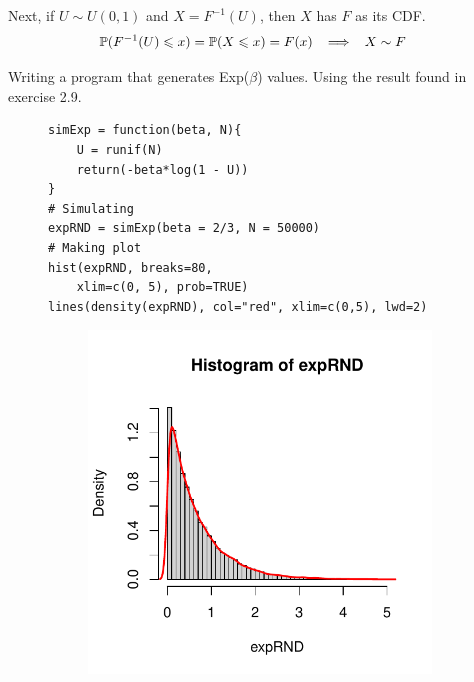 Next, if $U\sim U(0,1)$ and $X = F^{-1}(U)$, then $X$ has $F$ as its CDF. %
\begin{align*}
    \mathbb{P}(F^{-1}(U)\leqslant x) &= \mathbb{P}(X \leqslant x) = F(x) \;\;\implies\;\; X\sim F
\end{align*}

Writing a program that generates Exp($\beta$) values. Using the result found in exercise 2.9.

\begin{figure}[H]
    \begin{minipage}{0.5\textwidth}
        \begin{lstlisting}[style=RSyntax]
simExp = function(beta, N){
    U = runif(N)
    return(-beta*log(1 - U))
}
# Simulating
expRND = simExp(beta = 2/3, N = 50000)
# Making plot
hist(expRND, breaks=80,
    xlim=c(0, 5), prob=TRUE)
lines(density(expRND), col="red", xlim=c(0,5), lwd=2)
        \end{lstlisting}
        \begin{center}
            \begin{figure}[H]
            \includegraphics[scale=0.7]{ch2_2.15.pdf}
            \end{figure}
        \end{center}
    \end{minipage}
    \begin{minipage}{0.5\textwidth}

\end{minipage}
\end{figure}

